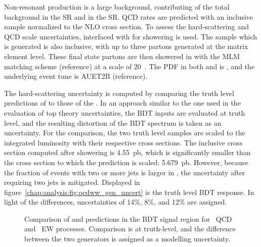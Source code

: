 Non-resonant \wwtwoj production is a large background,
contributing  of the total background in the \emme SR and  in
the \eemm SR. QCD \wwtwoj rates are predicted with an
inclusive \SHERPA sample normalized to the NLO \MCFM cross section. To
assess the hard-scattering and QCD scale uncertainties, \MADGRAPH interfaced
with  for showering is used. The sample which is generated is
also inclusive, with up to three partons generated at the matrix
element
level. These final state partons are then showered in \PYTHIA with the
MLM matching scheme (reference) at a scale of 20~\gev. The PDF in
both \MADGRAPH and \PYTHIA is \cteqsixl, and the underlying event tune
is AUET2B (reference). 

The hard-scattering uncertainty is computed by comparing
the truth level predictions of \MADGRAPH to those of the \SHERPA. In
an approach similar to the one used in the evaluation of top theory
uncertainties, the BDT inputs are
evaluated at truth level, and the resulting distortion of the BDT
spectrum is taken as an uncertainty. For the comparison, the two truth level
samples are scaled to the integrated luminosity with their respective
cross sections. The inclusive \MADGRAPH cross section computed after showering
is 4.55~pb, which is significantly smaller than the cross section to
which the \SHERPA prediction is scaled: 5.679~pb. However, because the
fraction of events with two or more jets is larger in \MADGRAPH, the
uncertainty after requiring two jets is mitigated. Displayed in
figure~\ref{chap:analysis:fig:qcdww_gen_uncert} is the truth level BDT
response. In light of the differences, uncertainties of 14\%, 8\%, and
12\% are assigned.

\begin{figure}[h]
    \centering
    \caption[Comparison of \MADGRAPH and \SHERPA predictions
    for \ww.]{Comparison of \MADGRAPH and \SHERPA predictions in the
    \emme BDT signal region for~
    QCD \ww and~ EW \ww
    processes. Comparison is at truth-level, and the difference
    between the two generators is assigned as a modelling uncertainty.}
\label{chap:analysis:fig:ww_gen_uncert}
\end{figure}

